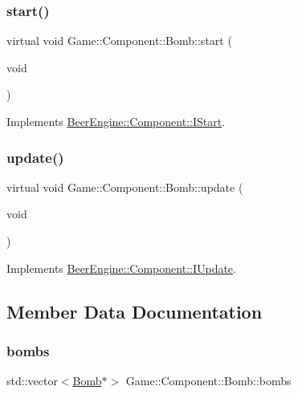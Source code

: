 \subsubsection{\texorpdfstring{start()}{start()}}
{\footnotesize\ttfamily virtual void Game\+::\+Component\+::\+Bomb\+::start (\begin{DoxyParamCaption}\item[{void}]{ }\end{DoxyParamCaption})\hspace{0.3cm}{\ttfamily [virtual]}}



Implements \mbox{\hyperlink{class_beer_engine_1_1_component_1_1_i_start_aa3e25e86e20c46cdaefc6f6d7f21e495}{Beer\+Engine\+::\+Component\+::\+I\+Start}}.

\mbox{\label{class_game_1_1_component_1_1_bomb_a6685384996c92b8d3f0955c2f6a335b5}} 
\subsubsection{\texorpdfstring{update()}{update()}}
{\footnotesize\ttfamily virtual void Game\+::\+Component\+::\+Bomb\+::update (\begin{DoxyParamCaption}\item[{void}]{ }\end{DoxyParamCaption})\hspace{0.3cm}{\ttfamily [virtual]}}



Implements \mbox{\hyperlink{class_beer_engine_1_1_component_1_1_i_update_aeeda0aa303175720e449b4c51d9867dd}{Beer\+Engine\+::\+Component\+::\+I\+Update}}.



\subsection{Member Data Documentation}
\mbox{\label{class_game_1_1_component_1_1_bomb_a9dc5871647b57df886487e2d936b4dcc}} 
\subsubsection{\texorpdfstring{bombs}{bombs}}
{\footnotesize\ttfamily std\+::vector$<$\mbox{\hyperlink{class_game_1_1_component_1_1_bomb}{Bomb}}$\ast$$>$ Game\+::\+Component\+::\+Bomb\+::bombs\hspace{0.3cm}{\ttfamily [static]}}

